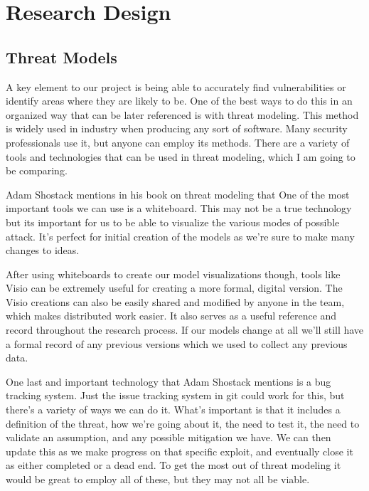 \documentclass[IEEEtran,letterpaper,10pt,notitlepage,draftclsnofoot,onecolumn]{article}
\begin{document}
\section{Research Design}
\subsection{Threat Models}
A key element to our project is being able to accurately find vulnerabilities or identify areas where they are likely to be. 
One of the best ways to do this in an organized way that can be later referenced is with threat modeling. 
This method is widely used in industry when producing any sort of software. Many security professionals use it, but anyone can employ its methods. 
There are a variety of tools and technologies that can be used in threat modeling, which I am going to be comparing.

Adam Shostack mentions in his book on threat modeling that  \cite[p.203]{TMDS}
One of the most important tools we can use is a whiteboard.
This may not be a true technology but its important for us to be able to visualize the various modes of possible attack.
It's perfect for initial creation of the models as we're sure to make many changes to ideas.

After using whiteboards to create our model visualizations though, tools like Visio can be extremely useful for creating a more formal, digital version.
The Visio creations can also be easily shared and modified by anyone in the team, which makes distributed work easier.
It also serves as a useful reference and record throughout the research process.
If our models change at all we'll still have a formal record of any previous versions which we used to collect any previous data.

One last and important technology that Adam Shostack mentions is a bug tracking system.
Just the issue tracking system in git could work for this, but there's a variety of ways we can do it. 
What's important is that it includes a definition of the threat, how we're going about it, the need to test it, the need to validate an assumption, and any possible mitigation we have. \cite[p.205]{TMDS}
We can then update this as we make progress on that specific exploit, and eventually close it as either completed or a dead end.
To get the most out of threat modeling it would be great to employ all of these, but they may not all be viable.
\end{document}
